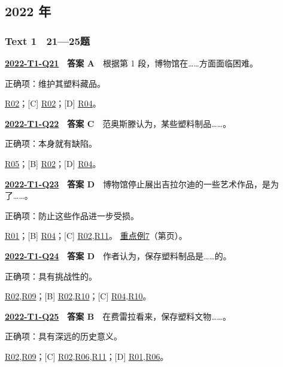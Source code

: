 \documentclass[11pt,a4paper]{article}
\begin{document}
\subsection{2022 年}\label{year-2022}
\subsubsection{Text 1　21—25题}
\label{idx-2022-T1-Q21}
\noindent\textbf{\href{https://zj139.github.io/math-notes/english/8d838346cad6a2c77d6282c8/\#q21}{2022-T1-Q21}　答案 A}　根据第 1 段，博物馆在……方面面临困难。\par\nopagebreak
\noindent 正确项：维护其塑料藏品。\par\nopagebreak
\noindent [B] \hyperref[cat-R02]{R02}；[C] \hyperref[cat-R02]{R02}；[D] \hyperref[cat-R04]{R04}。
\par\smallskip
{}\label{idx-2022-T1-Q22}
\noindent\textbf{\href{https://zj139.github.io/math-notes/english/8d838346cad6a2c77d6282c8/\#q22}{2022-T1-Q22}　答案 C}　范奥斯滕认为，某些塑料制品……。\par\nopagebreak
\noindent 正确项：本身就有缺陷。\par\nopagebreak
\noindent [A] \hyperref[cat-R05]{R05}；[B] \hyperref[cat-R02]{R02}；[D] \hyperref[cat-R04]{R04}。
\par\smallskip
{}\label{idx-2022-T1-Q23}
\noindent\textbf{\href{https://zj139.github.io/math-notes/english/8d838346cad6a2c77d6282c8/\#q23}{2022-T1-Q23}　答案 D}　博物馆停止展出吉拉尔迪的一些艺术作品，是为了……。\par\nopagebreak
\noindent 正确项：防止这些作品进一步受损。\par\nopagebreak
\noindent [A] \hyperref[cat-R01]{R01}；[B] \hyperref[cat-R04]{R04}；[C] \hyperref[cat-R02]{R02},\hyperref[cat-R11]{R11}。
\hyperref[case-2022-T1-Q23]{重点例7}（第\pageref{case-2022-T1-Q23}页）。
\par\smallskip
{}\label{idx-2022-T1-Q24}
\noindent\textbf{\href{https://zj139.github.io/math-notes/english/8d838346cad6a2c77d6282c8/\#q24}{2022-T1-Q24}　答案 D}　作者认为，保存塑料制品是……的。\par\nopagebreak
\noindent 正确项：具有挑战性的。\par\nopagebreak
\noindent [A] \hyperref[cat-R02]{R02},\hyperref[cat-R09]{R09}；[B] \hyperref[cat-R02]{R02},\hyperref[cat-R10]{R10}；[C] \hyperref[cat-R04]{R04},\hyperref[cat-R10]{R10}。
\par\smallskip
{}\label{idx-2022-T1-Q25}
\noindent\textbf{\href{https://zj139.github.io/math-notes/english/8d838346cad6a2c77d6282c8/\#q25}{2022-T1-Q25}　答案 B}　在费雷拉看来，保存塑料文物……。\par\nopagebreak
\noindent 正确项：具有深远的历史意义。\par\nopagebreak
\noindent [A] \hyperref[cat-R02]{R02},\hyperref[cat-R09]{R09}；[C] \hyperref[cat-R02]{R02},\hyperref[cat-R06]{R06},\hyperref[cat-R11]{R11}；[D] \hyperref[cat-R01]{R01},\hyperref[cat-R06]{R06}。
\par\smallskip
\end{document}
